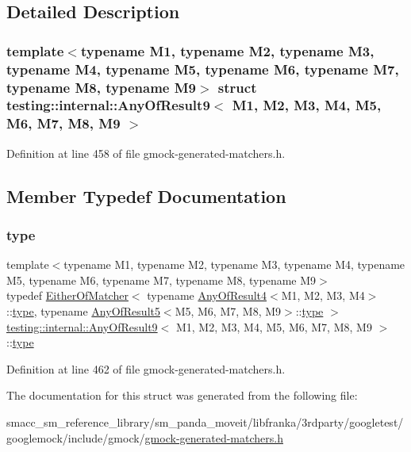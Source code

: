 \subsection{Detailed Description}
\subsubsection*{template$<$typename M1, typename M2, typename M3, typename M4, typename M5, typename M6, typename M7, typename M8, typename M9$>$\newline
struct testing\+::internal\+::\+Any\+Of\+Result9$<$ M1, M2, M3, M4, M5, M6, M7, M8, M9 $>$}



Definition at line 458 of file gmock-\/generated-\/matchers.\+h.



\subsection{Member Typedef Documentation}
\mbox{\label{structtesting_1_1internal_1_1AnyOfResult9_a308935fb02c62f502044dcc7b0a2b464}} 
\subsubsection{\texorpdfstring{type}{type}}
{\footnotesize\ttfamily template$<$typename M1, typename M2, typename M3, typename M4, typename M5, typename M6, typename M7, typename M8, typename M9$>$ \\
typedef \hyperlink{classtesting_1_1internal_1_1EitherOfMatcher}{Either\+Of\+Matcher}$<$ typename \hyperlink{structtesting_1_1internal_1_1AnyOfResult4}{Any\+Of\+Result4}$<$M1, M2, M3, M4$>$\+::\hyperlink{structtesting_1_1internal_1_1AnyOfResult9_a308935fb02c62f502044dcc7b0a2b464}{type}, typename \hyperlink{structtesting_1_1internal_1_1AnyOfResult5}{Any\+Of\+Result5}$<$M5, M6, M7, M8, M9$>$\+::\hyperlink{structtesting_1_1internal_1_1AnyOfResult9_a308935fb02c62f502044dcc7b0a2b464}{type} $>$ \hyperlink{structtesting_1_1internal_1_1AnyOfResult9}{testing\+::internal\+::\+Any\+Of\+Result9}$<$ M1, M2, M3, M4, M5, M6, M7, M8, M9 $>$\+::\hyperlink{structtesting_1_1internal_1_1AnyOfResult9_a308935fb02c62f502044dcc7b0a2b464}{type}}



Definition at line 462 of file gmock-\/generated-\/matchers.\+h.



The documentation for this struct was generated from the following file\+:\begin{DoxyCompactItemize}
\item 
smacc\+\_\+sm\+\_\+reference\+\_\+library/sm\+\_\+panda\+\_\+moveit/libfranka/3rdparty/googletest/googlemock/include/gmock/\hyperlink{gmock-generated-matchers_8h}{gmock-\/generated-\/matchers.\+h}\end{DoxyCompactItemize}
